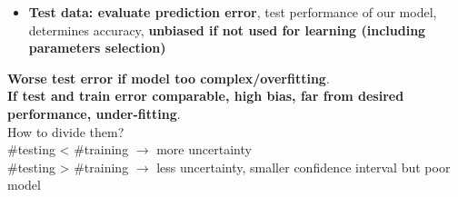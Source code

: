 \begin{itemize}
\begin{itemize}
            \item \textbf{Test data: evaluate prediction error}, test performance of our model, determines accuracy, \textbf{unbiased if not used for learning (including parameters selection)}
        \end{itemize}
        \textbf{Worse test error if model too complex/overfitting}.\\
        \textbf{If test and train error comparable, high bias, far from desired performance, under-fitting}.\\
        How to divide them?\\
        \#testing < \#training $\rightarrow$ more uncertainty\\
        \#testing > \#training $\rightarrow$ less uncertainty, smaller confidence interval but poor model
    \end{itemize}
